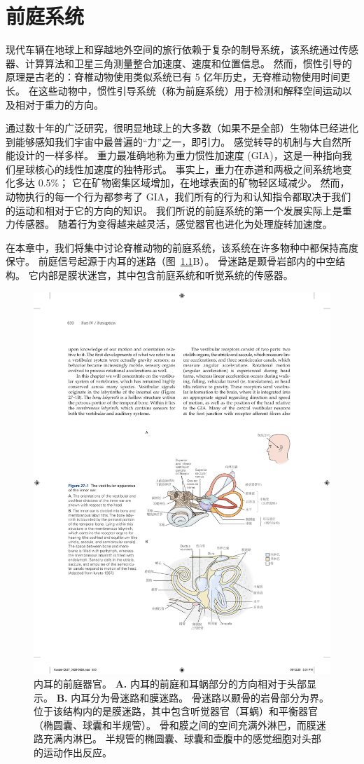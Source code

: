 \chapter{前庭系统} \label{chap:chap27}

现代车辆在地球上和穿越地外空间的旅行依赖于复杂的制导系统，该系统通过传感器、计算算法和卫星三角测量整合加速度、速度和位置信息。
然而，惯性引导的原理是古老的：脊椎动物使用类似系统已有 5 亿年历史，无脊椎动物使用时间更长。
在这些动物中，惯性引导系统（称为前庭系统）用于检测和解释空间运动以及相对于重力的方向。


通过数十年的广泛研究，很明显地球上的大多数（如果不是全部）生物体已经进化到能够感知我们宇宙中最普遍的“力”之一，即引力。
感觉转导的机制与大自然所能设计的一样多样。
重力最准确地称为重力惯性加速度 (GIA)，这是一种指向我们星球核心的线性加速度的独特形式。
事实上，重力在赤道和两极之间系统地变化多达 0.5\%；
它在矿物密集区域增加，在地球表面的矿物轻区域减少。
然而，动物执行的每一个行为都参考了 GIA，我们所有的行为和认知指令都取决于我们的运动和相对于它的方向的知识。
我们所说的前庭系统的第一个发展实际上是重力传感器。
随着行为变得越来越灵活，感觉器官也进化为处理旋转加速度。


在本章中，我们将集中讨论脊椎动物的前庭系统，该系统在许多物种中都保持高度保守。
前庭信号起源于内耳的迷路（图~\ref{fig:27_1}B）。
骨迷路是颞骨岩部内的中空结构。
它内部是膜状迷宫，其中包含前庭系统和听觉系统的传感器。


\begin{figure}[htbp]
	\centering
	\includegraphics[width=0.7\linewidth]{chap27/fig_27_1}
	\caption{内耳的前庭器官。
		\textbf{A.} 内耳的前庭和耳蜗部分的方向相对于头部显示。
		\textbf{B.} 内耳分为骨迷路和膜迷路。
		骨迷路以颞骨的岩骨部分为界。
		位于该结构内的是膜迷路，其中包含听觉器官（耳蜗）和平衡器官（椭圆囊、球囊和半规管）。
		骨和膜之间的空间充满外淋巴，而膜迷路充满内淋巴。
		半规管的椭圆囊、球囊和壶腹中的感觉细胞对头部的运动作出反应\cite{iurato2013submicroscopic}。}
	\label{fig:27_1}
\end{figure}


